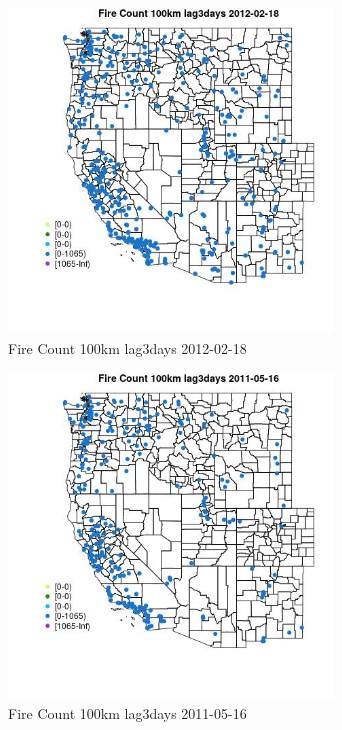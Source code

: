 \begin{figure} 
\centering  
\includegraphics[width=0.77\textwidth]{Code_Outputs/Report_ML_input_PM25_Step4_part_f_de_duplicated_aveswNAs_MapObsFire_Count_100km_lag3days2012-02-18.jpg} 
\caption{\label{fig:Report_ML_input_PM25_Step4_part_f_de_duplicated_aveswNAsMapObsFire_Count_100km_lag3days2012-02-18}Fire Count 100km lag3days 2012-02-18} 
\end{figure} 
 

\begin{figure} 
\centering  
\includegraphics[width=0.77\textwidth]{Code_Outputs/Report_ML_input_PM25_Step4_part_f_de_duplicated_aveswNAs_MapObsFire_Count_100km_lag3days2011-05-16.jpg} 
\caption{\label{fig:Report_ML_input_PM25_Step4_part_f_de_duplicated_aveswNAsMapObsFire_Count_100km_lag3days2011-05-16}Fire Count 100km lag3days 2011-05-16} 
\end{figure} 
 

